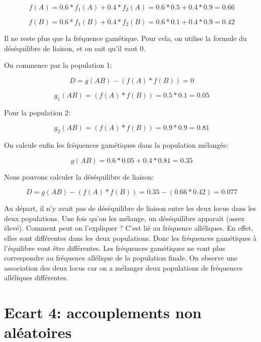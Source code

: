 \documentclass{article}
\begin{document}
\begin{equation}
f(A) = 0.6*f_1(A) + 0.4*f_2(A) = 0.6*0.5 + 0.4*0.9 = 0.66
\end{equation}

\begin{equation}
f(B) = 0.6*f_1(B) + 0.4*f_2(B) = 0.6*0.1 + 0.4*0.9 = 0.42
\end{equation}

Il ne reste plus que la fréquence gamétique. Pour cela, on utilise la formule du déséquilibre de liaison, et on sait qu'il vaut 0.

On commence par la population 1:

\begin{equation}
D = g(AB) - (f(A)*f(B)) = 0 
\end{equation}

\begin{equation}
g_1(AB) = (f(A)*f(B)) = 0.5 * 0.1 = 0.05
\end{equation}

Pour la population 2:

\begin{equation}
g_2(AB) = (f(A)*f(B)) = 0.9 * 0.9 = 0.81
\end{equation}

On calcule enfin les fréquences gamétiques dans la population mélangée:

\begin{equation}
g(AB) = 0.6 * 0.05 + 0.4 * 0.81 = 0.35
\end{equation}

Nous pouvons calculer la déséquilibre de liaison:

\begin{equation}
D = g(AB) - (f(A)*f(B)) = 0.35 - (0.66 * 0.42) = 0.077
\end{equation}

Au départ, il n'y avait pas de déséquilibre de liaison entre les deux locus dans les deux populations. Une fois qu'on les mélange, un déséquilibre apparait (assez élevé). Comment peut on l'expliquer ? C'est lié au fréquence alléliques. En effet, elles sont différentes dans les deux populations. Donc les fréquences gamétiques à l'équilibre vont être différentes. Les fréquences gamétiques ne vont plus correspondre au fréquence allélique de la population finale. On observe une association des deux locus car on a mélanger deux populations de fréquences alléliques différentes.


\pagebreak
\section{Ecart 4: accouplements non aléatoires}
\end{document}
